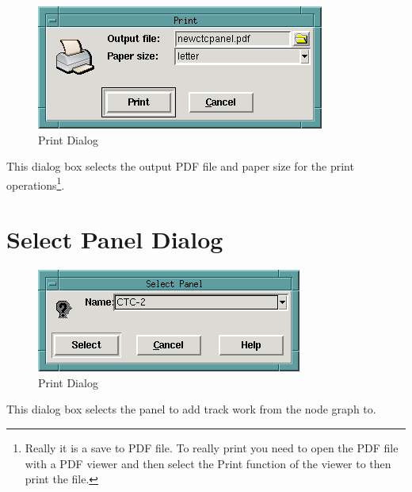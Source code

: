 \begin{figure}[hbpt]
\begin{centering}
\includegraphics{DISPPrintDialog.png}
\caption{Print Dialog}
\label{fig:dispatcher:printdialog}
\end{centering}
\end{figure}
%
This dialog box selects the output PDF file and paper size for the print
operations\footnote{Really it is a save to PDF file. To really print you
need to open the PDF file with a PDF viewer and then select the Print
function of the viewer to then print the file.}.

\section{Select Panel Dialog}

\begin{figure}[hbpt]
\begin{centering}
\includegraphics{DISPSelectCTCPanel.png}
\caption{Print Dialog}
\label{fig:dispatcher:selectctcpaneldialog}
\end{centering}
\end{figure}
%
This dialog box selects the panel to add track work from the node graph to.

